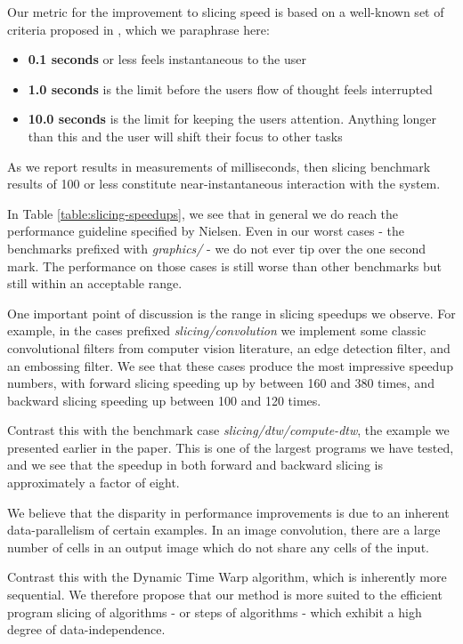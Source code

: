 Our metric for the improvement to slicing speed is based on a well-known set of
criteria proposed in \cite{nielsen93}, which we paraphrase here:

\begin{itemize}
    \item \textbf{0.1 seconds} or less feels instantaneous to the user
    \item \textbf{1.0 seconds} is the limit before the users flow of thought feels
    interrupted
    \item \textbf{10.0 seconds} is the limit for keeping the users attention. Anything longer
    than this and the user will shift their focus to other tasks
\end{itemize}

As we report results in measurements of milliseconds, then slicing benchmark results
of 100 or less constitute near-instantaneous interaction with the system. 

In Table \ref{table:slicing-speedups}, we see that in general we do reach
the performance guideline specified by Nielsen. Even in our worst cases - the
benchmarks prefixed with \textit{graphics/} - we do not ever tip over the one
second mark. The performance on those cases is still worse than other benchmarks
but still within an acceptable range. 

One important point of discussion is the range in slicing speedups we observe.
For example, in the cases prefixed \textit{slicing/convolution} we implement
some classic convolutional filters from computer vision literature, an edge 
detection filter, and an embossing filter. We see that these cases produce the
most impressive speedup numbers, with forward slicing speeding up by between
160 and 380 times, and backward slicing speeding up between 100 and 120 times.

Contrast this with the benchmark case \textit{slicing/dtw/compute-dtw}, the
example we presented earlier in the paper. This is one of the largest programs
we have tested, and we see that the speedup in both forward and backward slicing
is approximately a factor of eight.

We believe that the disparity in performance improvements is due to an inherent
data-parallelism of certain examples. In an image convolution, there are a large
number of cells in an output image which do not share any cells of the input.

Contrast this with the Dynamic Time Warp algorithm, which is inherently more
sequential. We therefore propose that our method is more suited to the efficient
program slicing of algorithms - or steps of algorithms - which exhibit a high
degree of data-independence. 

